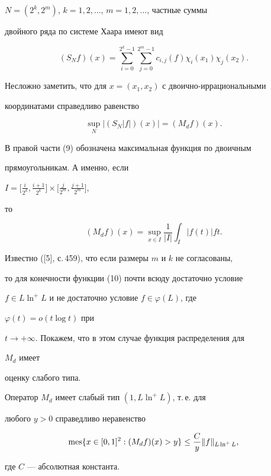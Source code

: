$N=(2^k,2^m)$, $k=1,2,\dotsc$, $m=1,2,\dotsc$, частные суммы 


двойного ряда по системе Хаара имеют вид 


$$ 


(S_N f)(x)=\sum^{2^k-1}_{i=0}\sum^{2^m-1}_{j=0} 


c_{i,j}(f)\chi_i(x_1)\chi_j(x_2). 


$$ 


Несложно заметить, что для $x=(x_1,x_2)$ с двоично-иррациональными 


координатами справедливо равенство 


\begin{equation} 


\sup_N|(S_N|f|)(x)|=(M_d f)(x). 


\end{equation} 


В правой части (9) обозначена максимальная функция по двоичным 


прямоугольникам. А именно, если 


$I=\big[\frac{i}{2^k},\frac{i+1}{2^k}\big]\times\big[ 


\frac{j}{2^m},\frac{j+1}{2^m}\big]$, 


то 


\begin{equation} 


(M_d f)(x)=\sup_{x\in I}\frac{1}{|I|}\int_I|f(t)|ft. 


\end{equation} 


 


Известно ([5], с.\,459), что если размеры $m$ и $k$ не согласованы, 


то для конечности функции (10) почти всюду достаточно условие 


$f\in L\ln^+L$ и не достаточно условие $f\in\varphi(L)$, где 


$\varphi(t)=o(t\log t)$ при 


$t\to+\infty$. Покажем, что в этом случае функция распределения для 


$M_d$ имеет 


оценку слабого типа. 


 


\begin{thm} 


Оператор $M_d$ имеет слабый тип $(1,L\ln^+L)$, т.\,е. для 


любого $y>0$ справедливо неравенство 


$$ 


\mes\{x\in[0,1]^2:(M_d f)(x)>y\}\le 


\frac{C}{y}\|f\|_{L\ln^+L}, 


$$ 


где $C$ --- абсолютная константа. 


\end{thm} 


